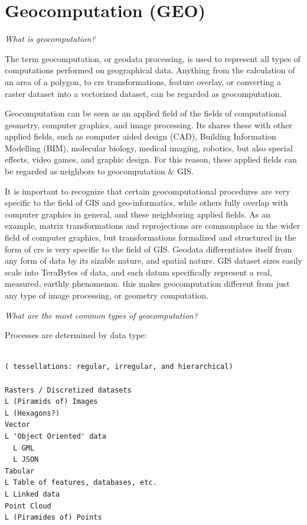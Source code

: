 \section{Geocomputation (GEO)}
\label{sec:background-geo}

\emph{What is geocomputation?}

The term geocomputation, or geodata processing, is used to represent all types of computations performed on geographical data. 
Anything from the calculation of an area of a polygon, to \ac{crs} transformations, feature overlay, or converting a raster dataset into a vectorized dataset, can be regarded as geocomputation.

Geocomputation can be seen as an applied field of the fields of computational geometry, computer graphics, and image processing. 
Its shares these with other applied fields, such as computer aided design (CAD), Building Information Modelling (BIM), molecular biology, medical imaging, robotics, but also special effects, video games, and graphic design.
For this reason, these applied fields can be regarded as neighbors to geocomputation \& GIS. 

It is important to recognize that certain geocomputational procedures are very specific to the field of GIS and geo-informatics, while others fully overlap with computer graphics in general, and these neighboring applied fields.
As an example, matrix transformations and reprojections are commonplace in the wider field of computer graphics, but transformations formalized and structured in the form of \ac*{crs} is very specific to the field of GIS.  
Geodata differentiates itself from any form of data by its sizable nature, and spatial nature. 
GIS dataset sizes easily scale into TeraBytes of data, and each datum specifically represent a real, measured, earthly phenomenon.
this makes geocomputation different from just any type of image processing, or geometry computation. 

\emph{What are the most common types of geocomputation?}

Processes are determined by data type:

\begin{lstlisting}

( tessellations: regular, irregular, and hierarchical)

Rasters / Discretized datasets
L (Piramids of) Images
L (Hexagons?)
Vector 
L 'Object Oriented' data
  L GML 
  L JSON 
Tabular
L Table of features, databases, etc. 
L Linked data
Point Cloud
L (Piramides of) Points
 
\end{lstlisting}


